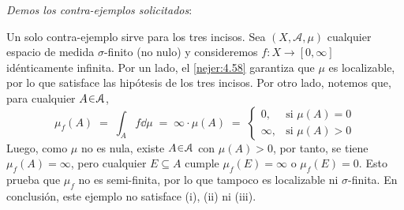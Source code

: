 \begin{sol}
\emph{Demos los contra-ejemplos solicitados}:\par
Un solo contra-ejemplo sirve para los tres incisos. Sea $(X,\mathcal{A},\mu)$ cualquier espacio de medida $\sigma$-finito (no nulo) y consideremos $f \colon X \to [0,\infty]$ idénticamente infinita. Por un lado, el \cref{nejer:4.58} garantiza que $\mu$ es localizable, por lo que satisface las hipótesis de los tres incisos. Por otro lado, notemos que, para cualquier $A\en\mathcal{A}$,
\[
\mu_f(A) 
\;=\; \int_A f\dd{\mu} 
\;=\; \infty\cdot\mu(A) 
\;=\; \begin{cases}
    0, &\text{si } \mu(A)=0\\
    \infty, &\text{si } \mu(A) >0
\end{cases}
\]
Luego, como $\mu$ no es nula, existe $A\en\mathcal{A}$ con $\mu(A)>0$, por tanto, se tiene $\mu_f(A) = \infty$, pero cualquier $E\subseteq A$ cumple $\mu_f(E) = \infty$ o $\mu_f(E)=0$. Esto prueba que $\mu_f$ no es semi-finita, por lo que tampoco es localizable ni $\sigma$-finita. En conclusión, este ejemplo no satisface (i), (ii) ni (iii). 
\end{sol}